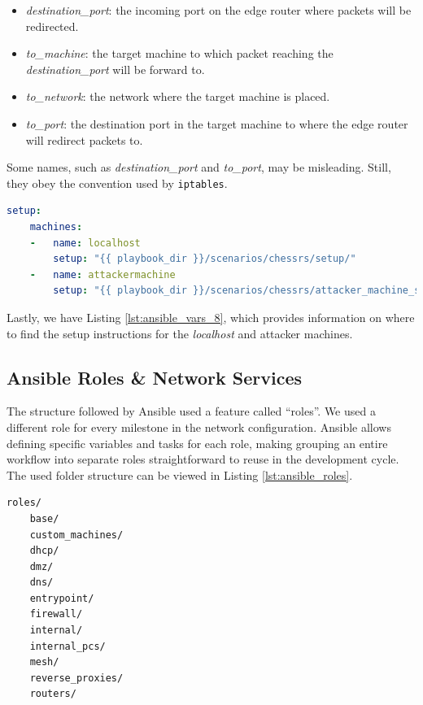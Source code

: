 \begin{itemize}
    \item \textit{destination\_port}: the incoming port on the edge router where packets will be redirected.
    \item \textit{to\_machine}: the target machine to which packet reaching the \textit{destination\_port} will be forward to.
    \item \textit{to\_network}: the network where the target machine is placed.
    \item \textit{to\_port}: the destination port in the target machine to where the edge router will redirect packets to.
\end{itemize}

Some names, such as \textit{destination\_port} and \textit{to\_port}, may be misleading. Still, they obey the convention used by \texttt{iptables}.

\begin{lstlisting}[language=yaml,caption=Ansible Variables - Setup Section.,numbers=none,label={lst:ansible_vars_8}]
setup:
    machines:
    -   name: localhost
        setup: "{{ playbook_dir }}/scenarios/chessrs/setup/"
    -   name: attackermachine
        setup: "{{ playbook_dir }}/scenarios/chessrs/attacker_machine_setup/*.j2"
\end{lstlisting}

Lastly, we have Listing \ref{lst:ansible_vars_8}, which provides information on where to find the setup instructions for the \textit{localhost} and attacker machines.

\subsection{Ansible Roles \& Network Services} \label{sec:ansible_roles}

The structure followed by Ansible used a feature called ``roles''. We used a different role for every milestone in the network configuration. Ansible allows defining specific variables and tasks for each role, making grouping an entire workflow into separate roles straightforward to reuse in the development cycle. The used folder structure can be viewed in Listing \ref{lst:ansible_roles}.

\begin{lstlisting}[caption=Ansible Roles' Folder Structure.,numbers=none,label={lst:ansible_roles}]
roles/
    base/             
    custom_machines/
    dhcp/
    dmz/
    dns/
    entrypoint/
    firewall/
    internal/
    internal_pcs/
    mesh/
    reverse_proxies/
    routers/
\end{lstlisting}

